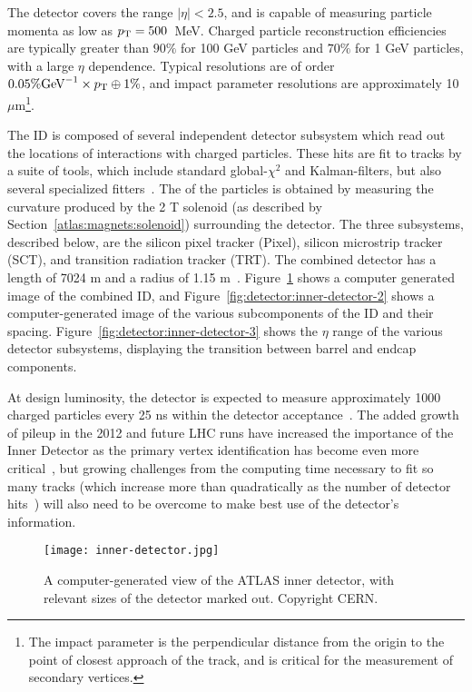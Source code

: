 The detector covers the range $|\eta| < 2.5$, and is capable of measuring particle momenta as low as $p_{\text{T}} = 500$~MeV. Charged particle reconstruction efficiencies are typically greater than $90\%$ for 100 GeV particles and $70\%$ for 1 GeV particles, with a large $\eta$ dependence. Typical \pT resolutions are of order $0.05\% \mathrm{GeV}^{-1} \times p_{\text{T}} \oplus 1\%$, and impact parameter resolutions are approximately 10 $\mu$m\footnote{The impact parameter is the perpendicular distance from the origin to the point of closest approach of the track, and is critical for the measurement of secondary vertices.}. 

The ID is composed of several independent detector subsystem which read out the locations of interactions with charged particles. These hits are fit to tracks by a suite of tools, which include standard global-$\chi^2$ and Kalman-filters, but also several specialized fitters~\cite{ATLASExpected}. The \pT of the particles is obtained by measuring the curvature produced by the 2 T solenoid (as described by Section~\ref{atlas:magnets:solenoid}) surrounding the detector. The three subsystems, described below, are the silicon pixel tracker (Pixel), silicon microstrip tracker (SCT), and transition radiation tracker (TRT). The combined detector has a length of 7024 m and a radius of 1.15 m~\cite{ATLASPaper}. Figure~\ref{fig:detector:inner-detector} shows a computer generated image of the combined ID, and Figure~\ref{fig:detector:inner-detector-2} shows a computer-generated image of the various subcomponents of the ID and their spacing. Figure~\ref{fig:detector:inner-detector-3} shows the $\eta$ range of the various detector subsystems, displaying the transition between barrel and endcap components.


At design luminosity, the detector is expected to measure approximately 1000 charged particles every 25 ns within the detector acceptance~\cite{ATLASExpected}. The added growth of pileup in the 2012 and future LHC runs have increased the importance of the Inner Detector as the primary vertex identification has become even more critical~\cite{ATLAS-CONF-2012-042}, but growing challenges from the computing time necessary to fit so many tracks (which increase more than quadratically as the number of detector hits~\cite{Combinatorics}) will also need to be overcome to make best use of the detector's information.


\begin{figure}
\centering
\texttt{[image: inner-detector.jpg]}
\label{fig:detector:inner-detector}
\caption{A computer-generated view of the ATLAS inner detector, with relevant sizes of the detector marked out. Copyright CERN.}
\end{figure}

